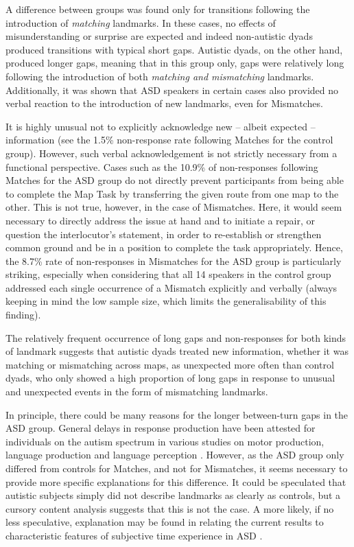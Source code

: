 A difference between groups was found only for transitions following the introduction of \emph{matching} landmarks. In these cases, no effects of misunderstanding or surprise are expected and indeed non-autistic dyads produced transitions with typical short gaps. Autistic dyads, on the other hand, produced longer gaps, meaning that in this group only, gaps were relatively long following the introduction of both \emph{matching and mismatching} landmarks. Additionally, it was shown that ASD speakers in certain cases also provided no verbal reaction to the introduction of new landmarks, even for Mismatches.

It is highly unusual not to explicitly acknowledge new -- albeit expected -- information (see the 1.5\% non-response rate following Matches for the control group). However, such verbal acknowledgement is not strictly necessary from a functional perspective. Cases such as the 10.9\% of non-responses following Matches for the ASD group do not directly prevent participants from being able to complete the Map Task by transferring the given route from one map to the other. This is not true, however, in the case of Mismatches. Here, it would seem necessary to directly address the issue at hand and to initiate a repair, or question the interlocutor's statement, in order to re-establish or strengthen common ground and be in a position to complete the task appropriately. Hence, the 8.7\% rate of non-responses in Mismatches for the ASD group is particularly striking, especially when considering that all 14 speakers in the control group addressed each single occurrence of a Mismatch explicitly and verbally (always keeping in mind the low sample size, which limits the generalisability of this finding).

The relatively frequent occurrence of long gaps and non-responses for both kinds of landmark suggests that autistic dyads treated new information, whether it was matching or mismatching across maps, as unexpected more often than control dyads, who only showed a high proportion of long gaps in response to unusual and unexpected events in the form of mismatching landmarks.

In principle, there could be many reasons for the longer between-turn gaps in the ASD group. General delays in response production have been attested for individuals on the autism spectrum in various studies on motor production, language production and language perception \citep[see e.g.][]{gernsbacherInfantToddlerOraland2008}. However, as the ASD group only differed from controls for Matches, and not for Mismatches, it seems necessary to provide more specific explanations for this difference. It could be speculated that autistic subjects simply did not describe landmarks as clearly as controls, but a cursory content analysis suggests that this is not the case. A more likely, if no less speculative, explanation may be found in relating the current results to characteristic features of subjective time experience in ASD \citep{zukauskasTemporalityAspergerSyndrome2009}.

